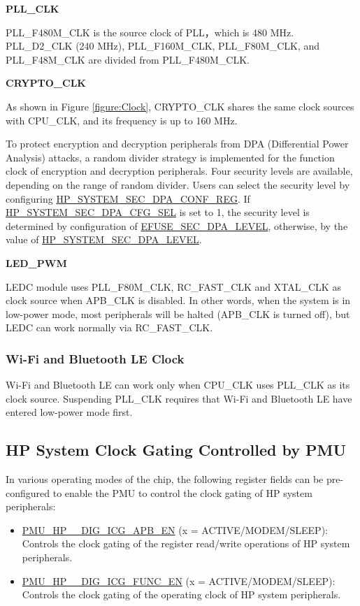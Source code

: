\documentclass[main\_\_EN.tex]{subfiles}
\begin{document}
\textbf{PLL\_CLK}

PLL\_F480M\_CLK is the source clock of PLL，which is 480 MHz. PLL\_D2\_CLK (240 MHz), PLL\_F160M\_CLK, PLL\_F80M\_CLK, and PLL\_F48M\_CLK are divided from PLL\_F480M\_CLK.


\textbf{CRYPTO\_CLK}

As shown in Figure \ref{figure:Clock}, CRYPTO\_CLK shares the same clock sources with CPU\_CLK, and its frequency is up to 160 MHz.


To protect encryption and decryption peripherals from DPA (Differential Power Analysis) attacks, a random divider strategy is implemented for the function clock of encryption and decryption peripherals. Four security levels are available, depending on the range of random divider. Users can select the security level by configuring  \hyperref[regdesc:HPSYSTEMSECDPACONFREG]{HP\_SYSTEM\_SEC\_DPA\_CONF\_REG}. If  \hyperref[fielddesc:HPSYSTEMSECDPACFGSEL]{HP\_SYSTEM\_SEC\_DPA\_CFG\_SEL} is set to 1, the security level is determined by configuration of \hyperref[fielddesc:EFUSESECDPALEVEL]{EFUSE\_SEC\_DPA\_LEVEL}, otherwise, by the value of  \hyperref[fielddesc:HPSYSTEMSECDPALEVEL]{HP\_SYSTEM\_SEC\_DPA\_LEVEL}.


\textbf{LED\_PWM}

LEDC module uses PLL\_F80M\_CLK, RC\_FAST\_CLK and XTAL\_CLK  as clock source when APB\_CLK is disabled. In other words, when the system is in low-power mode, most peripherals will be halted (APB\_CLK is turned off), but LEDC can work normally via RC\_FAST\_CLK.

\subsubsection{Wi-Fi and Bluetooth LE Clock}
Wi-Fi and Bluetooth LE can work only when CPU\_CLK uses PLL\_CLK as its clock source. Suspending PLL\_CLK requires that Wi-Fi and  Bluetooth LE have entered low-power mode first.

\subsection{HP System Clock Gating Controlled by PMU}

In various operating modes of the \chipname{} chip, the following register fields can be pre-configured to enable the PMU to control the clock gating of HP system peripherals:

\begin{itemize}
    \item \hyperref[fielddesc:PMUHPACTIVEDIGICGAPBEN]{PMU\_HP\_\_DIG\_ICG\_APB\_EN} (x = ACTIVE/MODEM/SLEEP): Controls the clock gating of the register read/write operations of HP system peripherals.
    \item \hyperref[fielddesc:PMUHPACTIVEDIGICGFUNCEN]{PMU\_HP\_\_DIG\_ICG\_FUNC\_EN} (x = ACTIVE/MODEM/SLEEP): Controls the clock gating of the operating clock of HP system peripherals.
\end{itemize}
\end{document}
